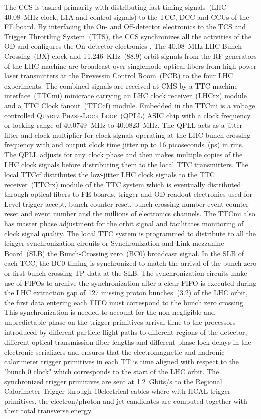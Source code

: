 \par 
The CCS is tasked primarily with distributing fast timing signals~(LHC 40.08~MHz clock, L1A  and control signals) to the TCC, DCC and CCUs of the FE board. By interfacing the On- and Off-detector electronics to the TCS and Trigger Throttling System~(TTS), the CCS synchronizes all the activities of the OD and configures the On-detector electronics \cite{ECALREADOUT}.  
\newline
The 40.08~MHz LHC Bunch-Crossing~(BX) clock and 11.246~KHz~(88.9\mus) orbit signals from the RF generators of the LHC machine are broadcast over singlemode optical fibers from high power laser transmitters at the Prevessin Control Room~(PCR) to the four LHC experiments. The combined signals  are received at CMS by a TTC machine interface~(TTCmi) minicrate carrying an LHC clock receiver~(LHCrx) module and a TTC Clock fanout~(TTCcf) module. Embedded in the TTCmi is a voltage controlled \textsc{Quartz Phase-Lock Loop}~(QPLL) ASIC chip with a clock frequency or locking range of 40.0749~MHz to 40.0823~MHz. The QPLL acts as a jitter-filter and clock multiplier for clock signals operating at the LHC bunch-crossing frequency with and output clock time jitter up to 16 picoseconds~(ps) in rms. The QPLL adjusts for any clock phase and then makes multiple copies of the LHC clock signals before distributing them to the local TTC transmitters. The local TTCcf distributes the low-jitter LHC clock signals to the TTC receiver~(TTCrx) module of the TTC system which is eventually distributed through optical fibers to FE boards, trigger and OD readout electronics used for Level trigger accept, bunch counter reset, bunch crossing number event counter reset and event number and the millions of electronics channels. The TTCmi also has master phase adjustment for the  orbit signal and facilitates monitoring of clock signal quality. The local TTC system is programmed to distribute to all the trigger synchronization circuits or Synchronization and Link mezzanine Board~(SLB) the  Bunch-Crossing zero~(BC0) broadcast signal. 
\newline
In the SLB of each TCC, the BC0 timing is synchronized \cite{TRIGSYNC} to match the arrival of the bunch zero or first bunch crossing TP data at the SLB. The synchronization circuits make use of FIFOs to archive the synchronization \ie after a clear FIFO is executed during the LHC extraction gap of 127 missing proton bunches~(3.2\mus) of the LHC orbit, the first data entering each FIFO must correspond to the bunch zero crossing. This synchronization is needed to account for the non-negligible and unpredictable phase on the trigger primitives arrival time to the processors introduced by different particle flight paths to different regions of the detector, different optical transmission fiber lengths and different phase lock delays in the electronic serializers and ensures that the electromagnetic and hadronic calorimeter trigger primitives in each TT is time aligned with respect to the "bunch 0 clock" which corresponds to the start of the LHC orbit. The synchronized trigger primitives are sent at 1.2~Gbits/s to the Regional Calorimeter Trigger through 10\m electrical cables where with HCAL trigger primitives, the electron/photon and jet candidates are computed together with their total transverse energy. 
